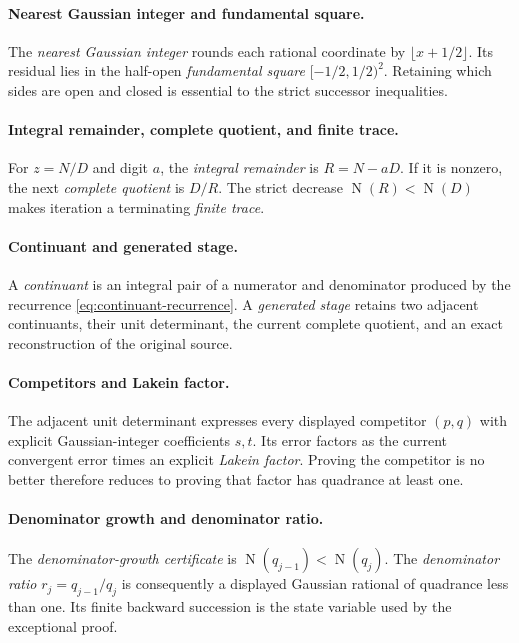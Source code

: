 \documentclass[11pt]{article}
\newcommand{\Norm}[1]{\operatorname{N}\!\left(#1\right)}
\begin{document}
\paragraph{Nearest Gaussian integer and fundamental square.}
The \emph{nearest Gaussian integer} rounds each rational coordinate by
$\lfloor x+1/2\rfloor$.  Its residual lies in the half-open
\emph{fundamental square} $[-1/2,1/2)^2$.  Retaining which sides are open and
closed is essential to the strict successor inequalities.

\paragraph{Integral remainder, complete quotient, and finite trace.}
For $z=N/D$ and digit $a$, the \emph{integral remainder} is $R=N-aD$.  If it
is nonzero, the next \emph{complete quotient} is $D/R$.  The strict decrease
$\Norm R<\Norm D$ makes iteration a terminating \emph{finite trace}.

\paragraph{Continuant and generated stage.}
A \emph{continuant} is an integral pair of a numerator and denominator
produced by the recurrence \eqref{eq:continuant-recurrence}.  A \emph{generated stage}
retains two adjacent continuants, their unit determinant, the current complete
quotient, and an exact reconstruction of the original source.

\paragraph{Competitors and Lakein factor.}
The adjacent unit determinant expresses every displayed competitor $(p,q)$
with explicit Gaussian-integer coefficients $s,t$.  Its error factors as the
current convergent error times an explicit \emph{Lakein factor}.  Proving the
competitor is no better therefore reduces to proving that factor has
quadrance at least one.

\paragraph{Denominator growth and denominator ratio.}
The \emph{denominator-growth certificate} is
$\Norm{q_{j-1}}<\Norm{q_j}$.  The \emph{denominator ratio}
$r_j=q_{j-1}/q_j$ is consequently a displayed Gaussian rational of quadrance
less than one.  Its finite backward succession is the state variable used by
the exceptional proof.
\end{document}
